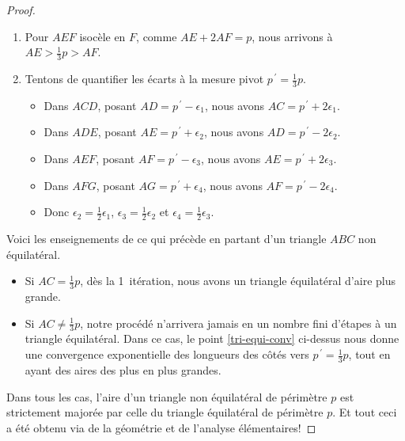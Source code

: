 \begin{proof}
\begin{enumerate}
		\item Pour $AEF$ isocèle en $F$, comme $AE + 2AF = p$, nous arrivons à  $AE > \frac13 p > AF$.
		
		
		\item \label{tri-equi-conv}
		Tentons de quantifier les écarts à la mesure pivot $p^{\,\prime} = \frac13 p$. 
		\begin{itemize}
			\item Dans $ACD$, posant $AD = p^{\,\prime} - \epsilon_1$, nous avons $AC = p^{\,\prime} + 2 \epsilon_1$.

			\item Dans $ADE$, posant $AE = p^{\,\prime} + \epsilon_2$, nous avons $AD = p^{\,\prime} - 2 \epsilon_2$.

			\item Dans $AEF$, posant $AF = p^{\,\prime} - \epsilon_3$, nous avons $AE = p^{\,\prime} + 2 \epsilon_3$.

			\item Dans $AFG$, posant $AG = p^{\,\prime} + \epsilon_4$, nous avons $AF = p^{\,\prime} - 2 \epsilon_4$.

			\item Donc
			$\epsilon_2 = \frac12 \epsilon_1$,
			$\epsilon_3 = \frac12 \epsilon_2$
			et
			$\epsilon_4 = \frac12 \epsilon_3$.
		\end{itemize}
	\end{enumerate}


	\smallskip
	
	Voici les enseignements de ce qui précède en partant d'un triangle $ABC$ non équilatéral.
	\begin{itemize}
		\item Si $AC = \frac13p$, dès la 1\iere\ itération, nous avons un triangle équilatéral d'aire plus grande.
		
		
		\item Si $AC \neq \frac13p$, notre procédé n'arrivera jamais en un nombre fini d'étapes à un triangle équilatéral.
		Dans ce cas, le point \ref{tri-equi-conv} ci-dessus nous donne une convergence exponentielle des longueurs des côtés vers $p^{\,\prime} = \frac13 p$, tout en ayant des aires des plus en plus grandes.
	\end{itemize}
	
	Dans tous les cas, l'aire d'un triangle non équilatéral de périmètre $p$ est strictement majorée par celle du triangle équilatéral de périmètre $p$. Et tout ceci a été obtenu via de la géométrie et de l'analyse élémentaires!
\end{proof}
